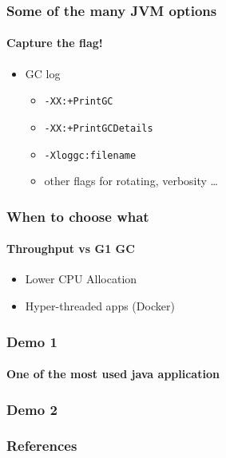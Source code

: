 \documentclass{beamer}
\begin{document}
\begin{frame}
    \frametitle{Some of the many JVM options}
    \framesubtitle{Capture the flag!}
    \begin{itemize}
        \item GC log 
        \begin{itemize}
            \item \texttt{-XX:+PrintGC} 
            \item \texttt{-XX:+PrintGCDetails}
            \item \texttt{-Xloggc:filename}
            \item other flags for rotating, verbosity \dots
        \end{itemize}
    \end{itemize}
\end{frame}


\begin{frame}
    \frametitle{When to choose what}
    \framesubtitle{Throughput vs G1 GC}
    \begin{itemize}
        \item Lower CPU Allocation
        \item Hyper-threaded apps (Docker)
    \end{itemize}
\end{frame}


\begin{frame}
    \frametitle{Demo 1}
    \framesubtitle{One of the most used java application}
\end{frame}

\begin{frame}
    \frametitle{Demo 2}
    
\end{frame}
\begin{frame}
    \frametitle{References}
   
\end{frame}
\end{document}
